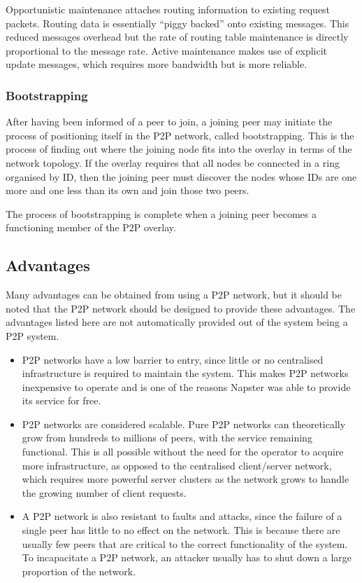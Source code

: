 Opportunistic maintenance attaches routing information to existing request packets. Routing data is essentially ``piggy backed'' onto existing messages. This reduced messages overhead but the rate of routing table maintenance is directly proportional to the message rate. Active maintenance makes use of explicit update messages, which requires more bandwidth but is more reliable.


\subsubsection{Bootstrapping}

After having been informed of a peer to join, a joining peer may initiate the process of positioning itself in the P2P network, called bootstrapping. This is the process of finding out where the joining node fits into the overlay in terms of the network topology. If the overlay requires that all nodes be connected in a ring organised by ID, then the joining peer must discover the nodes whose IDs are one more and one less than its own and join those two peers.

The process of bootstrapping is complete when a joining peer becomes a functioning member of the P2P overlay.


\subsection{Advantages}

Many advantages can be obtained from using a P2P network, but it should be noted that the P2P network should be designed to provide these advantages. The advantages listed here are not automatically provided out of the system being a P2P system.

\begin{itemize}
\item P2P networks have a low barrier to entry, since little or no centralised infrastructure is required to maintain the system. This makes P2P networks inexpensive to operate and is one of the reasons Napster was able to provide its service for free.

\item P2P networks are considered scalable. Pure P2P networks can theoretically grow from hundreds to millions of peers, with the service remaining functional. This is all possible without the need for the operator to acquire more infrastructure, as opposed to the centralised client/server network, which requires more powerful server clusters as the network grows to handle the growing number of client requests.

\item A P2P network is also resistant to faults and attacks, since the failure of a single peer has little to no effect on the network. This is because there are usually few peers that are critical to the correct functionality of the system. To incapacitate a P2P network, an attacker usually has to shut down a large proportion of the network.
\end{itemize}


